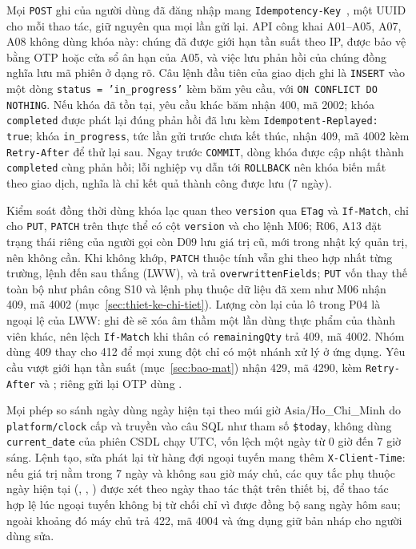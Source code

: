 Mọi \texttt{POST} ghi của người dùng đã đăng nhập mang \texttt{Idempotency-Key}~\cite{idempotencykey}, một UUID cho mỗi thao tác, giữ nguyên qua mọi lần gửi lại. API công khai A01--A05, A07, A08 không dùng khóa này: chúng đã được giới hạn tần suất theo IP, được bảo vệ bằng OTP hoặc cửa sổ ân hạn của A05, và việc lưu phản hồi của chúng đồng nghĩa lưu mã phiên ở dạng rõ. Câu lệnh đầu tiên của giao dịch ghi là \texttt{INSERT} vào  một dòng \texttt{status = 'in\_progress'} kèm băm yêu cầu, với \texttt{ON CONFLICT DO NOTHING}. Nếu khóa đã tồn tại, yêu cầu khác băm nhận 400, mã 2002; khóa \texttt{completed} được phát lại đúng phản hồi đã lưu kèm \texttt{Idempotent-Replayed: true}; khóa \texttt{in\_progress}, tức lần gửi trước chưa kết thúc, nhận 409, mã 4002 kèm \texttt{Retry-After} để thử lại sau. Ngay trước \texttt{COMMIT}, dòng khóa được cập nhật thành \texttt{completed} cùng phản hồi; lỗi nghiệp vụ dẫn tới \texttt{ROLLBACK} nên khóa biến mất theo giao dịch, nghĩa là chỉ kết quả thành công được lưu (7 ngày).

Kiểm soát đồng thời dùng khóa lạc quan theo \texttt{version} qua \texttt{ETag} và \texttt{If-Match}, chỉ cho \texttt{PUT}, \texttt{PATCH} trên thực thể có cột \texttt{version} và cho lệnh M06; R06, A13 đặt trạng thái riêng của người gọi còn D09 lưu giá trị cũ, mới trong nhật ký quản trị, nên không cần. Khi không khớp, \texttt{PATCH} thuộc tính vẫn ghi theo hợp nhất từng trường, lệnh đến sau thắng (LWW), và trả \texttt{overwrittenFields}; \texttt{PUT} vốn thay thế toàn bộ như phân công S10 và lệnh phụ thuộc dữ liệu đã xem như M06 nhận 409, mã 4002 (mục~\ref{sec:thiet-ke-chi-tiet}). Lượng còn lại của lô trong P04 là ngoại lệ của LWW: ghi đè sẽ xóa âm thầm một lần dùng thực phẩm của thành viên khác, nên lệch \texttt{If-Match} khi thân có \texttt{remainingQty} trả 409, mã 4002. Nhóm dùng 409 thay cho 412 để mọi xung đột chỉ có một nhánh xử lý ở ứng dụng. Yêu cầu vượt giới hạn tần suất (mục~\ref{sec:bao-mat}) nhận 429, mã 4290, kèm \texttt{Retry-After} và ; riêng gửi lại OTP dùng .

Mọi phép so sánh ngày dùng ngày hiện tại theo múi giờ Asia/Ho\_Chi\_Minh do \texttt{platform/clock} cấp và truyền vào câu SQL như tham số \texttt{\$today}, không dùng \texttt{current\_date} của phiên CSDL chạy UTC, vốn lệch một ngày từ 0 giờ đến 7 giờ sáng. Lệnh tạo, sửa phát lại từ hàng đợi ngoại tuyến mang thêm \texttt{X-Client-Time}: nếu giá trị nằm trong 7 ngày và không sau giờ máy chủ, các quy tắc phụ thuộc ngày hiện tại (, , ) được xét theo ngày thao tác thật trên thiết bị, để thao tác hợp lệ lúc ngoại tuyến không bị từ chối chỉ vì được đồng bộ sang ngày hôm sau; ngoài khoảng đó máy chủ trả 422, mã 4004 và ứng dụng giữ bản nháp cho người dùng sửa.


